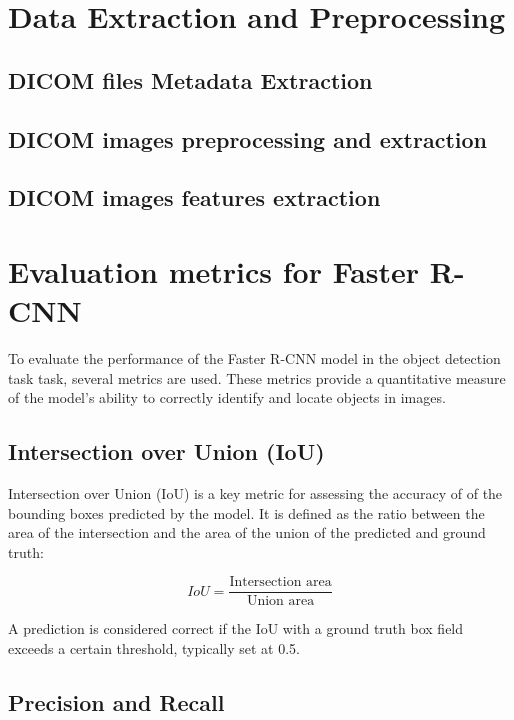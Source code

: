 \documentclass[12pt,oneside]{book} %
\begin{document}
\section{Data Extraction and Preprocessing}
\subsection{DICOM files Metadata Extraction}

\subsection{DICOM images preprocessing and extraction}

\subsection{DICOM images features extraction}

\section{Evaluation metrics for Faster R-CNN}

To evaluate the performance of the Faster R-CNN model in the object detection
task task, several metrics are used. These metrics provide a quantitative
measure of the model's ability to correctly identify and locate objects in
images.

\subsection{Intersection over Union (IoU)}

Intersection over Union (IoU) is a key metric for assessing the accuracy of of
the bounding boxes predicted by the model. It is defined as the ratio between
the area of the intersection and the area of the union of the predicted and
ground truth:

\begin{equation}
    IoU = \frac{\text{Intersection area}}{\text{Union area}}
\end{equation}

A prediction is considered correct if the IoU with a ground truth box field
exceeds a certain threshold, typically set at 0.5.

\subsection{Precision and Recall}
\end{document}
